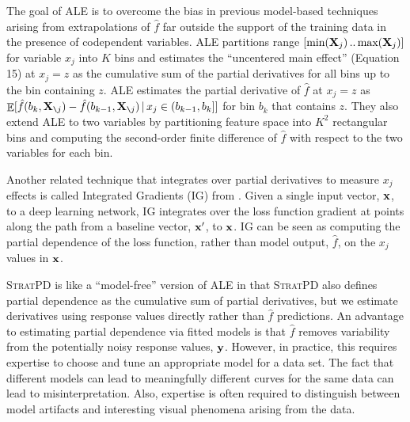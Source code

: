\documentclass[]{article} %
\newcommand{\spd}{\fontfamily{cmr}\textsc{\small StratPD}}
\renewcommand{\slash}{\texttt{\char`\\}}
\DeclareMathOperator{\Ex}{\mathbb{E}}
\begin{document}

The goal of ALE \citep{ALE} is to overcome the bias in previous model-based techniques arising from extrapolations of $\hat{f}$ far outside the support of the training data in the presence of codependent variables.   ALE  partitions range $[\text{min}({\bf X}_j) \,..\, \text{max}({\bf X}_j)]$ for variable $x_j$ into $K$ bins and estimates the ``uncentered main effect'' (Equation 15) at $x_j = z$ as the cumulative sum of the partial derivatives for all bins up to the bin containing $z$. ALE estimates the partial derivative of $\hat{f}$ at $x_j=z$ as $\Ex[\hat{f}(b_k, {\bf X}_{\slash j}) - \hat{f}(b_{k-1}, {\bf X}_{\slash j}) \, | \, x_j \in (b_{k-1},b_k]]$ for bin $b_k$ that contains $z$. They also extend ALE to two variables by partitioning feature space into $K^2$ rectangular bins and computing the  second-order finite difference of $\hat{f}$ with respect to the two variables for each bin. 

Another related technique that integrates over partial derivatives to measure $x_j$ effects is called Integrated Gradients (IG) from \citet{intgrad}. Given a single input vector, $\bf x$, to a deep learning network, IG integrates over the loss function gradient at points along the path from a baseline vector, $\bf x'$, to $\bf x$. IG can be seen as computing the partial dependence of the loss function, rather than model output, $\hat{f}$, on the $x_j$ values in ${\bf x}$.

\spd{} is like a ``model-free'' version of ALE in that \spd{} also defines partial dependence as the cumulative sum of partial derivatives, but we estimate derivatives using response values directly rather than $\hat{f}$ predictions.  An advantage to estimating partial dependence via fitted models is that $\hat{f}$ removes variability from the potentially noisy response values, $\bf y$. However, in practice, this requires expertise to choose and tune an appropriate model for a data set.  The fact that different models can lead to meaningfully different curves for the same data can lead to misinterpretation.  Also, expertise is often required to distinguish between model artifacts and interesting visual phenomena arising from the data.
\end{document}
